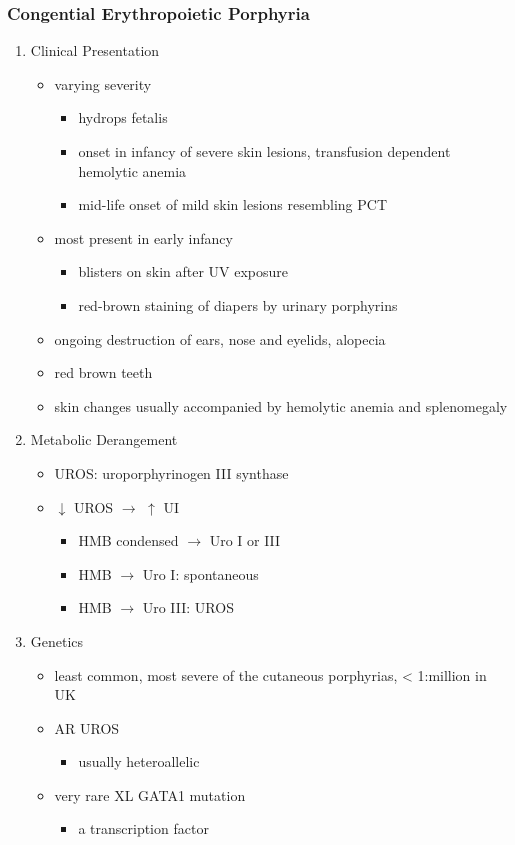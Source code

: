 \documentclass[12pt]{scrartcl}
\begin{document}
\subsubsection{Congential Erythropoietic Porphyria}
\label{sec:org94e481b}
\begin{enumerate}
\item Clinical Presentation
\label{sec:org318af86}
\begin{itemize}
\item varying severity
\begin{itemize}
\item hydrops fetalis
\item onset in infancy of severe skin lesions, transfusion dependent
hemolytic anemia
\item mid-life onset of mild skin lesions resembling PCT
\end{itemize}
\item most present in early infancy
\begin{itemize}
\item blisters on skin after UV exposure
\item red-brown staining of diapers by urinary porphyrins
\end{itemize}
\item ongoing destruction of ears, nose and eyelids, alopecia
\item red brown teeth
\item skin changes usually accompanied by hemolytic anemia and splenomegaly
\end{itemize}
\item Metabolic Derangement
\label{sec:orga59b9d3}
\begin{itemize}
\item UROS: uroporphyrinogen III synthase
\item \(\downarrow\) UROS \(\to\) \(\uparrow\) UI
\begin{itemize}
\item HMB condensed \(\to\) Uro I or III
\item HMB \(\rightarrow\) Uro I: spontaneous
\item HMB \(\rightarrow\) Uro III: UROS
\end{itemize}
\end{itemize}
\item Genetics
\label{sec:org4fc76ef}
\begin{itemize}
\item least common, most severe of the cutaneous porphyrias, < 1:million in UK
\item AR UROS
\begin{itemize}
\item usually heteroallelic
\end{itemize}
\item very rare XL GATA1 mutation
\begin{itemize}
\item a transcription factor
\end{itemize}
\end{itemize}


\end{enumerate}
\end{document}
